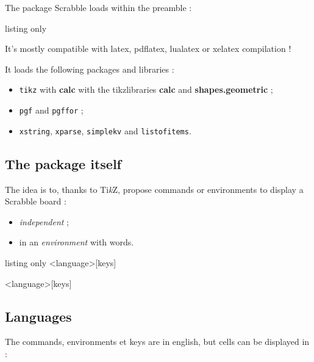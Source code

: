 \documentclass{article}
\newcommand\tikzlogo{Ti\textit{k}Z}
\let\TikZ\tikzlogo
\newcommand\Cle[1]{{\bfseries\sffamily\textlangle #1\textrangle}}
\begin{document}
The package \textsf{Scrabble} loads within the preamble :

\begin{PresentationCode}{listing only}
\usepackage{Scrabble}
\end{PresentationCode}

It's mostly compatible with \textsf{latex}, \textsf{pdflatex}, \textsf{lualatex} or \textsf{xelatex} compilation !

\medskip

It loads the following packages and libraries :

\begin{itemize}
	\item \texttt{tikz} with \Cle{calc} with the tikzlibraries \Cle{calc} and \Cle{shapes.geometric} ;
	\item \texttt{pgf} and \texttt{pgffor} ;
	\item \texttt{xstring}, \texttt{xparse}, \texttt{simplekv} and \texttt{listofitems}.
\end{itemize}

\subsection{The package itself}

The idea is to, thanks to \TikZ, propose commands or environments to display a Scrabble\texttrademark{} board :

\begin{itemize}
	\item \textit{independent} ;
	\item in an \textit{environment} with words.
\end{itemize}

\begin{PresentationCode}{listing only}
\ScrabbleBoard<language>[keys]

\begin{EnvScrabble}<language>[keys]
\end{EnvScrabble}
\end{PresentationCode}

\subsection{Languages}

The \textsf{commands}, \textsf{environments} et \textsf{keys} are in english, but cells can be displayed in :
\end{document}
